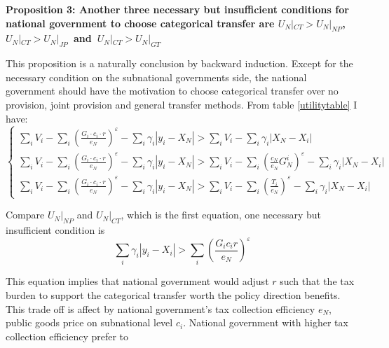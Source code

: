 \begin{itemize}
\textbf{Proposition 3: Another three necessary but insufficient conditions for national government to choose categorical transfer are $U_N|_{CT} > U_N|_{NP}$,\ $U_N|_{CT} > U_N|_{JP}$\ and\ $U_N|_{CT} > U_N|_{GT}$}

This proposition is a naturally conclusion by backward induction. Except for the necessary condition on the subnational governments side, the national government should have the motivation to choose categorical transfer over no provision, joint provision and general transfer methods. From table \ref{utilitytable} I have:
$$
    \left\{\begin{array}{l}
        \sum_i V_i-\sum_i\left(\frac{G_i \cdot c_i \cdot r}{e_N}\right)^{\varepsilon}-\sum_i\gamma_i\left|y_i-X_N\right| > \sum_i V_i-\sum_i \gamma_i\left|X_N-X_i\right|                                                      \\
        \sum_i V_i-\sum_i\left(\frac{G_i \cdot c_i \cdot r}{e_N}\right)^{\varepsilon}-\sum_i\gamma_i\left|y_i-X_N\right|> \sum_i V_i-\sum_i\left(\frac{c_N}{e_N} G_N^i\right)^{\varepsilon}-\sum_i\gamma_i\left|X_N-X_i\right| \\
        \sum_i V_i-\sum_i\left(\frac{G_i \cdot c_i \cdot r}{e_N}\right)^{\varepsilon}-\sum_i\gamma_i\left|y_i-X_N\right|> \sum_i V_i-\sum_i\left(\frac{T_i}{e_N}\right)^{\varepsilon}-\sum_i \gamma_i \left|X_N-X_i\right|
    \end{array}\right.
$$

Compare $U_N|_{NP}$ and $U_N|_{CT}$, which is the first equation, one necessary but insufficient condition is
$$\sum_i \gamma_i|y_i - X_i| > \sum_i (\frac{G_i c_i r}{e_N})^\varepsilon$$

This equation implies that national government would adjust $r$ such that the tax burden to support the categorical transfer worth the policy direction benefits. This trade off is affect by national government's tax collection efficiency $e_N$, public goods price on subnational level $c_i$. National government with higher tax collection efficiency prefer to




\end{itemize}
